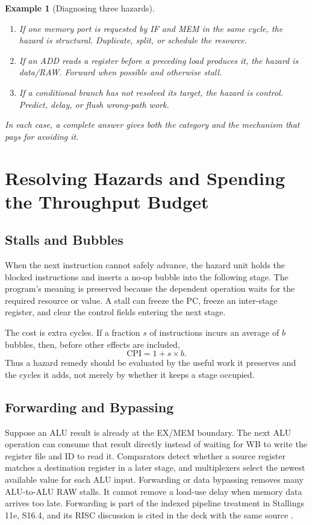 \documentclass[11pt]{article}
\newtheorem{example}{Example}[section]
\begin{document}
\begin{example}[Diagnosing three hazards]
\label{ex:taxonomy}
\begin{enumerate}
  \item If one memory port is requested by IF and MEM in the same cycle, the
        hazard is structural. Duplicate, split, or schedule the resource.
  \item If an ADD reads a register before a preceding load produces it, the
        hazard is data/RAW. Forward when possible and otherwise stall.
  \item If a conditional branch has not resolved its target, the hazard is
        control. Predict, delay, or flush wrong-path work.
\end{enumerate}
In each case, a complete answer gives both the category and the mechanism that
pays for avoiding it.
\end{example}

\section{Resolving Hazards and Spending the Throughput Budget}
\label{sec:resolution}

\subsection{Stalls and Bubbles}

When the next instruction cannot safely advance, the hazard unit holds the
blocked instructions and inserts a no-op bubble into the following stage. The
program's meaning is preserved because the dependent operation waits for the
required resource or value. A stall can freeze the PC, freeze an inter-stage
register, and clear the control fields entering the next stage.

The cost is extra cycles. If a fraction $s$ of instructions incurs an average
of $b$ bubbles, then, before other effects are included,
\[
  \mathrm{CPI}=1+s\times b.
\]
Thus a hazard remedy should be evaluated by the useful work it preserves and
the cycles it adds, not merely by whether it keeps a stage occupied.

\subsection{Forwarding and Bypassing}

Suppose an ALU result is already at the EX/MEM boundary. The next ALU
operation can consume that result directly instead of waiting for WB to write
the register file and ID to read it. Comparators detect whether a source
register matches a destination register in a later stage, and multiplexers
select the newest available value for each ALU input. Forwarding or data
bypassing removes many ALU-to-ALU RAW stalls. It cannot remove a load-use delay
when memory data arrives too late. Forwarding is part of the indexed pipeline
treatment in Stallings 11e, S16.4, and its RISC discussion is cited in the
deck with the same source \cite{Stallings2015_computer_organization}.
\end{document}
